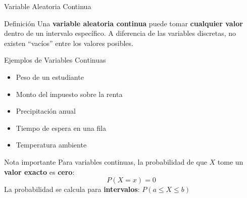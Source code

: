 \documentclass[10pt]{beamer}
\begin{document}
\begin{frame}{Variable Aleatoria Continua}
\begin{block}{Definición}
Una \textbf{variable aleatoria continua} puede tomar \textbf{cualquier valor} dentro de un intervalo específico. A diferencia de las variables discretas, no existen ``vacíos'' entre los valores posibles.
\end{block}

\vspace{0.3cm}
\begin{exampleblock}{Ejemplos de Variables Continuas}
\begin{itemize}
  \item Peso de un estudiante
  \item Monto del impuesto sobre la renta
  \item Precipitación anual
  \item Tiempo de espera en una fila
  \item Temperatura ambiente
\end{itemize}
\end{exampleblock}

\vspace{0.3cm}
\begin{alertblock}{Nota importante}
Para variables continuas, la probabilidad de que $X$ tome un \textbf{valor exacto} es \textbf{cero}:
$$P(X = x) = 0$$
La probabilidad se calcula para \textbf{intervalos}: $P(a \leq X \leq b)$
\end{alertblock}
\end{frame}
\end{document}
